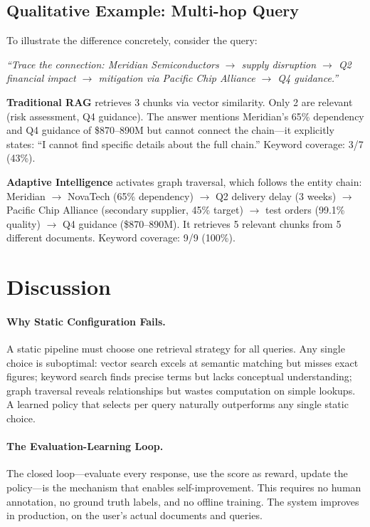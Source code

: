 \documentclass[11pt]{article}
\begin{document}
\subsection{Qualitative Example: Multi-hop Query}

To illustrate the difference concretely, consider the query:

\medskip
\noindent\textit{``Trace the connection: Meridian Semiconductors $\rightarrow$ supply disruption $\rightarrow$ Q2 financial impact $\rightarrow$ mitigation via Pacific Chip Alliance $\rightarrow$ Q4 guidance.''}
\medskip

\textbf{Traditional RAG} retrieves 3 chunks via vector similarity. Only 2 are relevant (risk assessment, Q4 guidance). The answer mentions Meridian's 65\% dependency and Q4 guidance of \$870--890M but cannot connect the chain---it explicitly states: ``I cannot find specific details about the full chain.'' Keyword coverage: 3/7 (43\%).

\textbf{Adaptive Intelligence} activates graph traversal, which follows the entity chain: Meridian $\rightarrow$ NovaTech (65\% dependency) $\rightarrow$ Q2 delivery delay (3 weeks) $\rightarrow$ Pacific Chip Alliance (secondary supplier, 45\% target) $\rightarrow$ test orders (99.1\% quality) $\rightarrow$ Q4 guidance (\$870--890M). It retrieves 5 relevant chunks from 5 different documents. Keyword coverage: 9/9 (100\%).

\section{Discussion}
\label{sec:discussion}

\paragraph{Why Static Configuration Fails.}
A static pipeline must choose one retrieval strategy for all queries. Any single choice is suboptimal: vector search excels at semantic matching but misses exact figures; keyword search finds precise terms but lacks conceptual understanding; graph traversal reveals relationships but wastes computation on simple lookups. A learned policy that selects per query naturally outperforms any single static choice.

\paragraph{The Evaluation-Learning Loop.}
The closed loop---evaluate every response, use the score as reward, update the policy---is the mechanism that enables self-improvement. This requires no human annotation, no ground truth labels, and no offline training. The system improves in production, on the user's actual documents and queries.
\end{document}
